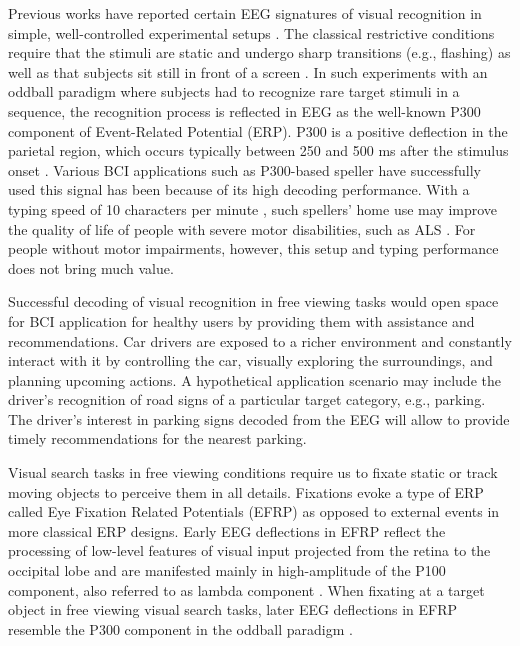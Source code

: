 \documentclass[12pt]{iopart}
\begin{document}
Previous works have reported certain EEG signatures of visual recognition in simple, well-controlled experimental setups
\cite{gerson_cortically_2006,krusienski_toward_2008,rosenthal_evoked_2014,jangraw_neurally_2014}.
The classical restrictive conditions require that
the stimuli are static and undergo sharp
transitions (e.g., flashing) as well as  that
subjects sit still in front of a screen \cite{krusienski_toward_2008}. 
In such experiments with an oddball paradigm 
where subjects had to recognize
rare target stimuli in a sequence, the recognition process
is reflected in EEG as the well-known P300 component of Event-Related Potential (ERP).
P300 is a positive deflection in the parietal region, which occurs
typically between 250 and 500 ms after the stimulus onset \cite{polich_updating_2007}.
Various BCI applications such as P300-based speller have successfully used
this signal has been because of its high decoding performance.
With a typing speed of 10 characters per minute \cite{rezeika_braincomputer_2018},
such spellers' home use may improve the quality of life
of people with severe motor disabilities, such as ALS
\cite{sellers_brain-computer_2010,holz_long-term_2015,wolpaw_independent_2018}.
For people without motor impairments, however, this setup and typing performance does not bring much value.

Successful decoding of visual recognition in free viewing tasks
would open space for BCI application for healthy users
by providing them with assistance and recommendations.
Car drivers are exposed to a richer environment and constantly interact with it
by controlling the car, visually exploring the surroundings, and
planning upcoming actions. 
A hypothetical application scenario may include
the driver's recognition of road signs of a particular target category, e.g., parking.
The driver's interest in parking signs decoded from the EEG
will allow to provide timely recommendations for the nearest parking.

Visual search tasks in free viewing conditions require us to fixate static or track moving objects to perceive them in all details. Fixations evoke a type of ERP called Eye Fixation Related Potentials (EFRP)
as opposed to external events in more classical ERP designs.
Early EEG deflections in EFRP reflect the processing of low-level features 
of visual input projected from the retina to the occipital lobe 
and are manifested mainly in high-amplitude 
of the P100 component, also referred to as lambda component \cite{evans_further_1952}.
When fixating at a target object in free viewing visual search tasks, later EEG deflections in EFRP resemble the P300 component in the oddball paradigm \cite{brouwer_distinguishing_2013,kaunitz_looking_2014,devillez_eye_2015}.
\end{document}
